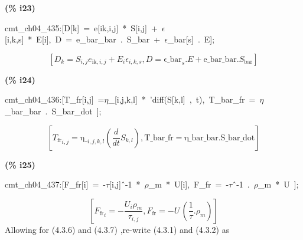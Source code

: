 \documentclass[fleqn]{article}
\begin{document}
\noindent
\begin{minipage}[t]{4.000000em}\color{red}\bfseries
(\% i23)	
\end{minipage}
\begin{minipage}[t]{\textwidth}\color{blue}
cmt\_ch04\_435:[D[k]\ =\ e[ik,i,j]\ *\ S[i,j]\ +\ \ensuremath{\epsilon}[i,k,s]\ *\ E[i],\ D\ =\ e\_bar\_bar\ .\ S\_bar\ +\ \ensuremath{\epsilon}\_bar[s]\ .\ E];
\end{minipage}
\[\displaystyle \tag{\% o23} 
\left[ {D_k}={S_{i,j}} {e_{\ensuremath{\mathrm{ik}},i,j}}+{E_i} {{\epsilon }_{i,k,s}}\operatorname{,}D={{\ensuremath{\mathrm{\epsilon \_ bar}}}_s}\ensuremath{\mathrm{ . }}E+\ensuremath{\mathrm{e\_ bar\_ bar}}\ensuremath{\mathrm{ . }}{S_{\ensuremath{\mathrm{bar}}}}\right] \mbox{}
\]


\noindent
\begin{minipage}[t]{4.000000em}\color{red}\bfseries
(\% i24)	
\end{minipage}
\begin{minipage}[t]{\textwidth}\color{blue}
cmt\_ch04\_436:[T\_fr[i,j]\ =\ensuremath{\eta}\_[i,j,k,l]\ *\ 'diff(S[k,l]\ ,\ t),\ T\_bar\_fr\ =\ \ensuremath{\eta}\_bar\_bar\ .\ S\_bar\_dot\ ];
\end{minipage}
\[\displaystyle \tag{\% o24} 
\left[ {{{T_{\ensuremath{\mathrm{fr}}}}}_{i,j}}={{\ensuremath{\mathrm{\eta \_ }}}_{i,j,k,l}} \left( \frac{d}{d t} {S_{k,l}}\right) \operatorname{,}\ensuremath{\mathrm{T\_ bar\_ fr}}=\ensuremath{\mathrm{\eta \_ bar\_ bar}}\ensuremath{\mathrm{ . }}\ensuremath{\mathrm{S\_ bar\_ dot}}\right] \mbox{}
\]


\noindent
\begin{minipage}[t]{4.000000em}\color{red}\bfseries
(\% i25)	
\end{minipage}
\begin{minipage}[t]{\textwidth}\color{blue}
cmt\_ch04\_437:[F\_fr[i]\ =\ -\ensuremath{\tau}[i,j]\^\ -1\ *\ \ensuremath{\rho}\_m\ *\ U[i],\ F\_fr\ =\ -\ensuremath{\tau}\^\ -1\ .\ \ensuremath{\rho}\_m\ *\ U\ ];
\end{minipage}
\[\displaystyle \tag{\% o25} 
\left[ {{{F_{\ensuremath{\mathrm{fr}}}}}_i}=-\frac{{U_i} {{\rho }_m}}{{{\tau }_{i,j}}}\operatorname{,}{F_{\ensuremath{\mathrm{fr}}}}=-U\, \left( \frac{1}{\tau }\ensuremath{\mathrm{ . }}{{\rho }_m}\right) \right] \mbox{}
\]
Allowing for (4.3.6) and (4.3.7) ,re-write (4.3.1) and (4.3.2) as
\end{document}

